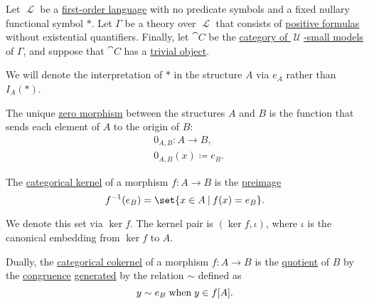 \begin{proposition}\label{thm:zero_morphisms_pointed}
  Let \( \mscrL \) be a \hyperref[def:first_order_language]{first-order language} with no predicate symbols and a fixed nullary functional symbol \( \ast \). Let \( \Gamma \) be a theory over \( \mscrL \) that consists of \hyperref[def:positive_formula]{positive formulas} without existential quantifiers. Finally, let \( \cat{C} \) be the \hyperref[def:category_of_small_first_order_models]{category of \( \mscrU \)-small models} of \( \Gamma \), and suppose that \( \cat{C} \) has a \hyperref[def:trivial_object]{trivial object}.

  We will denote the interpretation of \( \ast \) in the structure \( A \) via \( e_A \) rather than \( I_A(\ast) \).

  \begin{thmenum}
     The unique \hyperref[def:zero_morphisms/morphism]{zero morphism} between the structures \( A \) and \( B \) is the function that sends each element of \( A \) to the origin of \( B \):
    \begin{equation*}
      \begin{aligned}
        &0_{A,B}: A \to B, \\
        &0_{A,B}(x) \coloneqq e_B.
      \end{aligned}
    \end{equation*}

     The \hyperref[def:zero_morphisms/kernel]{categorical kernel} of a morphism \( f: A \to B \) is the \hyperref[def:set_valued_map/inverse]{preimage}
    \begin{equation*}
      f^{-1}(e_B) = \set{ x \in A \given f(x) = e_B }.
    \end{equation*}

    We denote this set via \( \ker f \). The kernel pair is \( (\ker f, \iota) \), where \( \iota \) is the canonical embedding from \( \ker f \) to \( A \).

     Dually, the \hyperref[def:zero_morphisms/cokernel]{categorical cokernel} of a morphism \( f: A \to B \) is the \hyperref[def:first_order_quotient]{quotient} of \( B \) by the \hyperref[def:first_order_congruence]{congruence} \hyperref[def:first_order_generated_congruence]{generated} by the relation \( {\sim} \) defined as
    \begin{equation*}
      y \sim e_B \T{when} y \in f[A].
    \end{equation*}


\end{thmenum}
\end{proposition}
